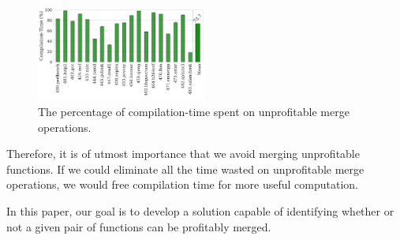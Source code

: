 \begin{figure}[h]
  \centering
  \includegraphics[width=0.5\textwidth]{figs/unprofitable-compile-time-percentage.pdf}
  \vspace{-2.5em}
  \caption{The percentage of compilation-time spent on unprofitable merge operations.}
  \label{fig:unprofitable-compile-time-percentage}
\end{figure}

Therefore, it is of utmost importance that we avoid merging unprofitable functions.
If we could eliminate all the time wasted on unprofitable merge operations, we would free compilation time for more useful computation.

In this paper, our goal is to develop a solution capable of identifying whether or not a given pair of functions can be profitably merged.

